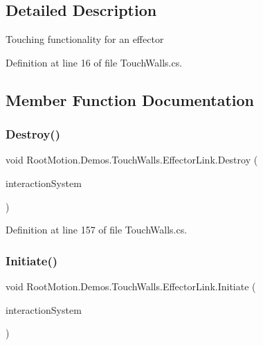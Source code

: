 \subsection{Detailed Description}
Touching functionality for an effector 



Definition at line 16 of file Touch\+Walls.\+cs.



\subsection{Member Function Documentation}
\mbox{\label{class_root_motion_1_1_demos_1_1_touch_walls_1_1_effector_link_a65670aa39db4bf9dbc93ed717c2436ef}} 
\subsubsection{\texorpdfstring{Destroy()}{Destroy()}}
{\footnotesize\ttfamily void Root\+Motion.\+Demos.\+Touch\+Walls.\+Effector\+Link.\+Destroy (\begin{DoxyParamCaption}\item[{\mbox{\hyperlink{class_root_motion_1_1_final_i_k_1_1_interaction_system}{Interaction\+System}}}]{interaction\+System }\end{DoxyParamCaption})}



Definition at line 157 of file Touch\+Walls.\+cs.

\mbox{\label{class_root_motion_1_1_demos_1_1_touch_walls_1_1_effector_link_aaf3747ff183dc5646f7848bacd1c8a68}} 
\subsubsection{\texorpdfstring{Initiate()}{Initiate()}}
{\footnotesize\ttfamily void Root\+Motion.\+Demos.\+Touch\+Walls.\+Effector\+Link.\+Initiate (\begin{DoxyParamCaption}\item[{\mbox{\hyperlink{class_root_motion_1_1_final_i_k_1_1_interaction_system}{Interaction\+System}}}]{interaction\+System }\end{DoxyParamCaption})}



